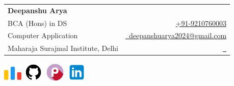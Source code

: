 \documentclass[a4paper,11pt]{article}
\makeatletter
\newcommand{\name}{Deepanshu Arya} %
\newcommand{\course}{BCA (Hons) in DS} %
\newcommand{\roll}{04014902021} %
\newcommand{\phone}{9210760003} %
\newcommand{\emaila}{deepanshuarya2024@gmail.com} %
\newcommand{\emailb}{} %
\makeatother
\begin{document}


\parbox{2.4cm}{%
}
\parbox{\dimexpr\linewidth-2.8cm\relax}{
\begin{tabularx}{\linewidth}{L r} \\
  \textbf{\Large \name} \\
  \course & {\raisebox{0.0\height}{\footnotesize \faPhone}\ \href{callto:\phone}{+91-\phone}}\\
  {Computer Application} &  \href{personal mail:\emaila}{\raisebox{0.0\height}{\footnotesize \faEnvelope}\ {\emaila}} \\
  {Maharaja Surajmal Institute, Delhi} &  \href{college mail:\emailb}{\raisebox{0.0\height}{\footnotesize  }\ {}}\\
\end{tabularx}
\vspace{-5.0mm}
}
\parbox{18.6cm}{%
\flushright
\vspace{-6.5mm}
\href{https://codeforces.com/profile/TLE_lord}{\includegraphics[width=0.9cm,clip]{codeforces.png}}
\hspace{0.5em}
\href{https://github.com/sudo-arya/}{\includegraphics[width=1cm,clip]{icons8-github-480.png}}
\hspace{0.5em}
\href{https://play.picoctf.org/users/sudo_arya}{\includegraphics[width=1cm,clip]{picoCTF_logo.jpeg}}
\hspace{0.5em}
\href{https://www.linkedin.com/in/deepanshu-arya-2931a822b/}{\includegraphics[width=1cm,clip]{icons8-linked-in-480.png}}
\hspace{0.5em}
}
\vspace{-8.0mm}
\end{document}
